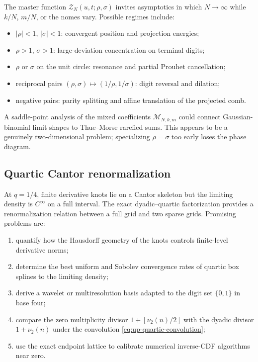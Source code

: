 \documentclass[11pt,oneside]{article}
\numberwithin{equation}{section}
\theoremstyle{definition}
\theoremstyle{remark}
\newcommand{\floor}[1]{\left\lfloor#1\right\rfloor}
\newcommand{\Zpart}{\mathscr Z}
\begin{document}
The master function $\Zpart_N(u,t;\rho,\sigma)$ invites asymptotics in which
$N\to\infty$ while $k/N$, $m/N$, or the nomes vary.  Possible regimes include:
\begin{itemize}
\item $|\rho|<1$, $|\sigma|<1$: convergent position and projection energies;
\item $\rho>1$, $\sigma>1$: large-deviation concentration on terminal digits;
\item $\rho$ or $\sigma$ on the unit circle: resonance and partial Prouhet
      cancellation;
\item reciprocal pairs $(\rho,\sigma)\mapsto(1/\rho,1/\sigma)$: digit reversal
      and dilation;
\item negative pairs: parity splitting and affine translation of the projected
      comb.
\end{itemize}
A saddle-point analysis of the mixed coefficients
$\mathcal M_{N,k,m}$ could connect Gaussian-binomial limit shapes to
Thue--Morse rarefied sums.  This appears to be a genuinely two-dimensional
problem; specializing $\rho=\sigma$ too early loses the phase diagram.

\subsection{Quartic Cantor renormalization}

At $q=1/4$, finite derivative knots lie on a Cantor skeleton but the limiting
density is $C^\infty$ on a full interval.  The exact dyadic--quartic
factorization provides a renormalization relation between a full grid and two
sparse grids.  Promising problems are:
\begin{enumerate}
\item quantify how the Hausdorff geometry of the knots controls finite-level
      derivative norms;
\item determine the best uniform and Sobolev convergence rates of quartic box
      splines to the limiting density;
\item derive a wavelet or multiresolution basis adapted to the digit set
      $\{0,1\}$ in base four;
\item compare the zero multiplicity divisor
      $1+\floor{\nu_2(n)/2}$ with the dyadic divisor $1+\nu_2(n)$ under the
      convolution \eqref{eq:up-quartic-convolution};
\item use the exact endpoint lattice to calibrate numerical inverse-CDF
      algorithms near zero.
\end{enumerate}
\end{document}
